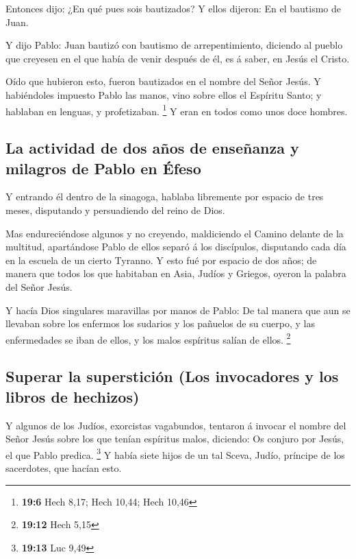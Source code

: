  Entonces dijo: ¿En qué pues sois bautizados? Y ellos
dijeron: En el bautismo de Juan.

 Y dijo Pablo: Juan bautizó con bautismo de arrepentimiento,
diciendo al pueblo que creyesen en el que había de venir después de él,
es á saber, en Jesús el Cristo.

 Oído que hubieron esto, fueron bautizados en el nombre del
Señor Jesús.  Y habiéndoles impuesto Pablo las manos, vino
sobre ellos el Espíritu Santo; y hablaban en lenguas, y profetizaban.
\footnote{\textbf{19:6} Hech 8,17; Hech 10,44; Hech 10,46} 
Y eran en todos como unos doce hombres.

\hypertarget{la-actividad-de-dos-auxf1os-de-enseuxf1anza-y-milagros-de-pablo-en-uxe9feso}{%
\subsection{La actividad de dos años de enseñanza y milagros de Pablo en
Éfeso}\label{la-actividad-de-dos-auxf1os-de-enseuxf1anza-y-milagros-de-pablo-en-uxe9feso}}

 Y entrando él dentro de la sinagoga, hablaba libremente por
espacio de tres meses, disputando y persuadiendo del reino de Dios.

 Mas endureciéndose algunos y no creyendo, maldiciendo el
Camino delante de la multitud, apartándose Pablo de ellos separó á los
discípulos, disputando cada día en la escuela de un cierto Tyranno.
 Y esto fué por espacio de dos años; de manera que todos
los que habitaban en Asia, Judíos y Griegos, oyeron la palabra del Señor
Jesús.

 Y hacía Dios singulares maravillas por manos de Pablo:
 De tal manera que aun se llevaban sobre los enfermos los
sudarios y los pañuelos de su cuerpo, y las enfermedades se iban de
ellos, y los malos espíritus salían de ellos. \footnote{\textbf{19:12}
  Hech 5,15}

\hypertarget{superar-la-supersticiuxf3n-los-invocadores-y-los-libros-de-hechizos}{%
\subsection{Superar la superstición (Los invocadores y los libros de
hechizos)}\label{superar-la-supersticiuxf3n-los-invocadores-y-los-libros-de-hechizos}}

 Y algunos de los Judíos, exorcistas vagabundos, tentaron á
invocar el nombre del Señor Jesús sobre los que tenían espíritus malos,
diciendo: Os conjuro por Jesús, el que Pablo predica. \footnote{\textbf{19:13}
  Luc 9,49}  Y había siete hijos de un tal Sceva, Judío,
príncipe de los sacerdotes, que hacían esto.

